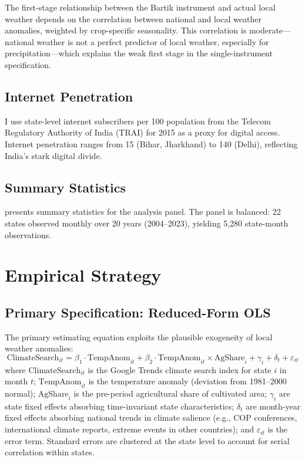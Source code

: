 \documentclass[12pt]{article}
\begin{document}
The first-stage relationship between the Bartik instrument and actual local weather depends on the correlation between national and local weather anomalies, weighted by crop-specific seasonality. This correlation is moderate---national weather is not a perfect predictor of local weather, especially for precipitation---which explains the weak first stage in the single-instrument specification.

\subsection{Internet Penetration}

I use state-level internet subscribers per 100 population from the Telecom Regulatory Authority of India (TRAI) for 2015 as a proxy for digital access. Internet penetration ranges from 15 (Bihar, Jharkhand) to 140 (Delhi), reflecting India's stark digital divide.

\subsection{Summary Statistics}

 presents summary statistics for the analysis panel. The panel is balanced: 22 states observed monthly over 20 years (2004--2023), yielding 5,280 state-month observations.



\section{Empirical Strategy}

\subsection{Primary Specification: Reduced-Form OLS}

The primary estimating equation exploits the plausible exogeneity of local weather anomalies:
\begin{equation}
\text{ClimateSearch}_{it} = \beta_1 \cdot \text{TempAnom}_{it} + \beta_2 \cdot \text{TempAnom}_{it} \times \text{AgShare}_i + \gamma_i + \delta_t + \varepsilon_{it}
\label{eq:main}
\end{equation}
where $\text{ClimateSearch}_{it}$ is the Google Trends climate search index for state $i$ in month $t$; $\text{TempAnom}_{it}$ is the temperature anomaly (deviation from 1981--2000 normal); $\text{AgShare}_i$ is the pre-period agricultural share of cultivated area; $\gamma_i$ are state fixed effects absorbing time-invariant state characteristics; $\delta_t$ are month-year fixed effects absorbing national trends in climate salience (e.g., COP conferences, international climate reports, extreme events in other countries); and $\varepsilon_{it}$ is the error term. Standard errors are clustered at the state level to account for serial correlation within states.
\end{document}
